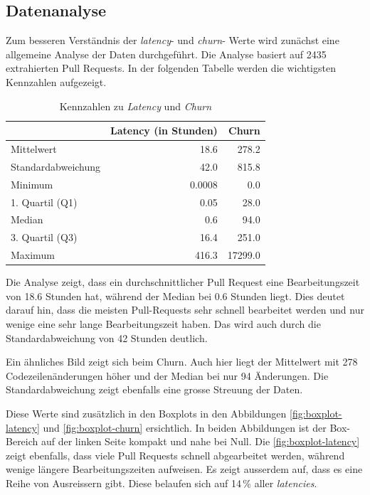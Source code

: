 \subsection{Datenanalyse}
Zum besseren Verständnis der \textit{latency}- und \textit{churn}- Werte wird zunächst eine allgemeine Analyse der Daten durchgeführt.
Die Analyse basiert auf 2435 extrahierten Pull Requests. In der folgenden Tabelle werden die wichtigsten Kennzahlen aufgezeigt.


\begin{table}[htbp]
    \centering
    \caption{Kennzahlen zu \textit{Latency} und \textit{Churn}}
    \begin{tabular}{@{}lrr@{}}
        \toprule
        \textbf & \textbf{Latency (in Stunden)} & \textbf{Churn} \\
         \midrule
        Mittelwert & 18.6 & 278.2 \\
        Standardabweichung &  42.0  & 815.8 \\
        Minimum & 0.0008 & 0.0 \\
        1. Quartil (Q1) & 0.05 & 28.0 \\
        Median & 0.6 & 94.0 \\
        3. Quartil (Q3) &  16.4   & 251.0 \\
        Maximum & 416.3 & 17299.0 \\
        \bottomrule
    \end{tabular}
    \label{tab:deskriptive-kennzahlen}
\end{table}

Die Analyse zeigt, dass ein durchschnittlicher Pull Request eine Bearbeitungszeit von 18.6 Stunden hat, während der Median bei 0.6 Stunden liegt. Dies deutet darauf hin, dass die meisten Pull-Requests sehr schnell bearbeitet werden und nur wenige eine sehr lange Bearbeitungszeit haben. Das wird auch durch die Standardabweichung von 42 Stunden deutlich.

Ein ähnliches Bild zeigt sich beim Churn. Auch hier liegt der Mittelwert mit 278 Codezeilenänderungen höher und der Median bei nur 94 Änderungen. Die Standardabweichung zeigt ebenfalls eine grosse Streuung der Daten.

Diese Werte sind zusätzlich in den Boxplots in den Abbildungen \autoref{fig:boxplot-latency} und \autoref{fig:boxplot-churn} ersichtlich. 
In beiden Abbildungen ist der Box-Bereich auf der linken Seite kompakt und nahe bei Null. 
Die \autoref{fig:boxplot-latency} zeigt ebenfalls, dass viele Pull Requests schnell abgearbeitet werden, während wenige längere Bearbeitungszeiten aufweisen. Es zeigt ausserdem auf, dass es eine Reihe von Ausreissern gibt. Diese belaufen sich auf 14\,\% aller \textit{latencies}.

